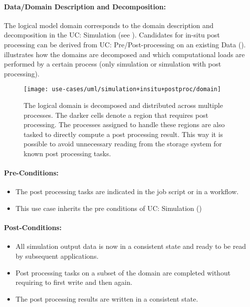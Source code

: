 \paragraph{Data/Domain Description and Decomposition:}
The logical model domain corresponds to the domain description and decomposition in the UC: Simulation (see ).
Candidates for in-situ post processing can be derived from UC: Pre/Post-processing on an existing Data ().
 illustrates how the domains are decomposed and which computational loads are performed by a certain process (only simulation or simulation with post processing).



\begin{figure}
	\centering
	\texttt{[image: use-cases/uml/simulation+insitu+postproc/domain]}
	\caption{The logical domain is decomposed and distributed across multiple processes. The darker cells denote a region that requires post processing. The processes assigned to handle these regions are also tasked to directly compute a post processing result. This way it is possible to avoid unnecessary reading from the storage system for known post processing tasks.}
	\label{fig:domain simulation+insitu+postproc}
\end{figure}




\paragraph{Pre-Conditions:}
\begin{itemize}
	\item The post processing tasks are indicated in the job script or in a workflow.
	\item This use case inherits the pre conditions of UC: Simulation ()
\end{itemize}


\paragraph{Post-Conditions:}
\begin{itemize}
	\item All simulation output data is now in a consistent state and ready to be read by subsequent applications.
	\item Post processing tasks on a subset of the domain are completed without requiring to first write and then again.
	\item The post processing results are written in a consistent state.
\end{itemize}



